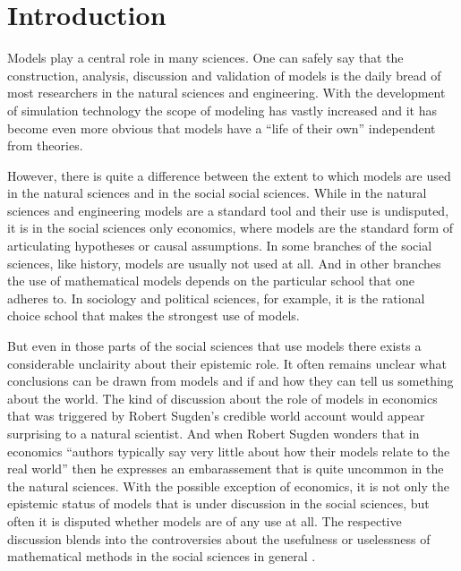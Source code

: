 \documentclass[onecollarge]{STJour}
\numberwithin{equation}{section}
\begin{document}
\doublespacing

\tableofcontents 

\section{Introduction}

Models play a central role in many sciences. One can safely say that the
construction, analysis, discussion and validation of models is the daily
bread of most researchers in the natural sciences and engineering.
With the development of simulation technology the scope of
modeling has vastly increased and it has become even more obvious that
models have a ``life of their own'' independent from theories. 

However, there is quite a difference between the extent to which models
are used in the natural sciences and in the social social sciences.
While in the natural sciences and engineering models are a standard
tool and their use is undisputed, it is in the social sciences
only economics, where models are the standard form of articulating
hypotheses or causal assumptions. In some branches of the social
sciences, like history, models are usually not used at
all. And in other branches the use of mathematical models depends on
the particular school that one adheres to. In sociology and political
sciences, for example, it is the rational choice school that makes the
strongest use of models.

But even in those parts of the social sciences that use models there
exists a considerable unclairity about their epistemic role. It often
remains unclear what conclusions can be drawn from models and if and how
they can tell us something about the world. The kind of discussion about
the role of models in economics that was triggered by Robert Sugden's
credible world account \citep{sugden:2000} would appear surprising to a
natural scientist. And when Robert Sugden wonders that in economics
``authors typically say very little about how their models relate to the
real world'' \citep[p.\ 25]{sugden:2009} then he expresses an
embarassement that is quite uncommon in the the natural sciences. With the possible
exception of economics, it is not only the epistemic status of models
that is under discussion in the social sciences, but often it is disputed
whether models are of any use at all. The respective discussion blends
into the controversies about the usefulness or uselessness of mathematical
methods in the social sciences in general \citep{green-shapiro:1994,
shapiro:2005}.
\end{document}
